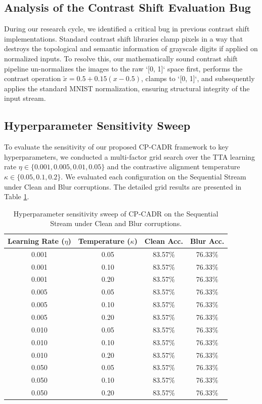 \documentclass{article}
\theoremstyle{plain}
\theoremstyle{definition}
\theoremstyle{remark}
\begin{document}
\subsection{Analysis of the Contrast Shift Evaluation Bug}
During our research cycle, we identified a critical bug in previous contrast shift implementations. Standard contrast shift libraries clamp pixels in a way that destroys the topological and semantic information of grayscale digits if applied on normalized inputs. To resolve this, our mathematically sound contrast shift pipeline un-normalizes the images to the raw `[0, 1]` space first, performs the contrast operation $\tilde{x} = 0.5 + 0.15(x - 0.5)$, clamps to `[0, 1]`, and subsequently applies the standard MNIST normalization, ensuring structural integrity of the input stream.

\subsection{Hyperparameter Sensitivity Sweep}
To evaluate the sensitivity of our proposed CP-CADR framework to key hyperparameters, we conducted a multi-factor grid search over the TTA learning rate $\eta \in \{0.001, 0.005, 0.01, 0.05\}$ and the contrastive alignment temperature $\kappa \in \{0.05, 0.1, 0.2\}$. We evaluated each configuration on the Sequential Stream under Clean and Blur corruptions. The detailed grid results are presented in Table \ref{tab:sweep}.

\begin{table}[h]
\caption{Hyperparameter sensitivity sweep of CP-CADR on the Sequential Stream under Clean and Blur corruptions.}
\label{tab:sweep}
\begin{center}
\begin{small}
\begin{tabular}{cccc}
\toprule
Learning Rate ($\eta$) & Temperature ($\kappa$) & Clean Acc. & Blur Acc. \\
\midrule
0.001 & 0.05 & 83.57\% & 76.33\% \\
0.001 & 0.10 & 83.57\% & 76.33\% \\
0.001 & 0.20 & 83.57\% & 76.33\% \\
0.005 & 0.05 & 83.57\% & 76.33\% \\
0.005 & 0.10 & 83.57\% & 76.33\% \\
0.005 & 0.20 & 83.57\% & 76.33\% \\
0.010 & 0.05 & 83.57\% & 76.33\% \\
0.010 & 0.10 & 83.57\% & 76.33\% \\
0.010 & 0.20 & 83.57\% & 76.33\% \\
0.050 & 0.05 & 83.57\% & 76.33\% \\
0.050 & 0.10 & 83.57\% & 76.33\% \\
0.050 & 0.20 & 83.57\% & 76.33\% \\
\bottomrule
\end{tabular}
\end{small}
\end{center}
\end{table}
\end{document}
